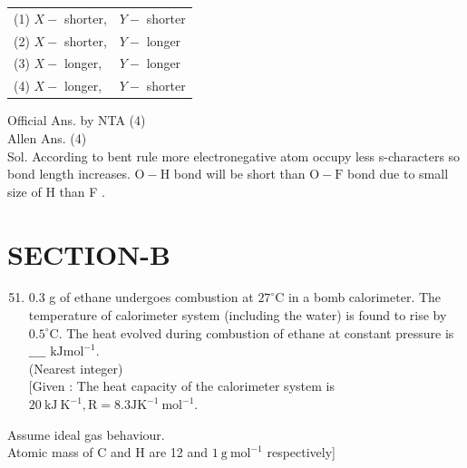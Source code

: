 \documentclass[10pt]{article}
\begin{document}
\begin{center}
\begin{tabular}{ll}
(1) \(X-\) shorter, & \(Y-\) shorter \\
(2) \(X-\) shorter, & \(Y-\) longer \\
(3) \(X-\) longer, & \(Y-\) longer \\
(4) \(X-\) longer, & \(Y-\) shorter \\
\end{tabular}
\end{center}

Official Ans. by NTA (4)\\
Allen Ans. (4)\\
Sol. According to bent rule more electronegative atom occupy less s-characters so bond length increases. \(\mathrm{O}-\mathrm{H}\) bond will be short than \(\mathrm{O}-\mathrm{F}\) bond due to small size of H than F .

\section*{SECTION-B}
\begin{enumerate}
  \setcounter{enumi}{50}
  \item 0.3 g of ethane undergoes combustion at \(27^{\circ} \mathrm{C}\) in a bomb calorimeter. The temperature of calorimeter system (including the water) is found to rise by \(0.5^{\circ} \mathrm{C}\). The heat evolved during combustion of ethane at constant pressure is \(\_\_\_\_\) \(\mathrm{kJ} \mathrm{mol}^{-1}\).\\
(Nearest integer)\\[0pt]
[Given : The heat capacity of the calorimeter system is \(20 \mathrm{~kJ} \mathrm{~K}^{-1}, \mathrm{R}=8.3 \mathrm{JK}^{-1} \mathrm{~mol}^{-1}\).
\end{enumerate}

Assume ideal gas behaviour.\\
Atomic mass of C and H are 12 and \(1 \mathrm{~g} \mathrm{~mol}^{-1}\) respectively]
\end{document}
